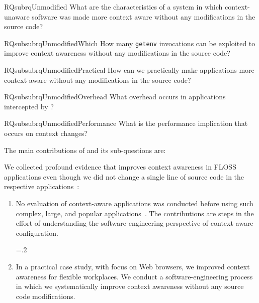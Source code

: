 \begin{restatable}{RQsub}{rqUnmodified}
What are the characteristics of a system in which context-unaware software was made more context aware without any modifications in the source code?%
\label{rq:unmodified}
\end{restatable}

\begin{restatable}{RQsubsub}{rqUnmodifiedWhich}
 \label{rq:unmodified-which}
How many \texttt{getenv} invocations can be exploited to improve context awareness without any modifications in the source code?
\end{restatable}

\begin{restatable}{RQsubsub}{rqUnmodifiedPractical}
\label{rq:unmodified-practical}
How can we practically make applications more context aware without any modifications in the source code?
\end{restatable}

\begin{restatable}{RQsubsub}{rqUnmodifiedOverhead}
\label{rq:unmodified-overhead}
What overhead occurs in applications intercepted by \elektra{}?
\end{restatable}

\begin{restatable}{RQsubsub}{rqUnmodifiedPerformance}
 \label{rq:unmodified-performance}
What is the performance implication that occurs on context changes?
\end{restatable}

The main contributions of  and its sub-questions are:
\begin{contribution}
We collected profound evidence that \elektra{} improves context awareness in FLOSS applications even though we did not change a single line of source code in the respective applications~\cite{raab2017introducing}:
\begin{enumerate}
\item
No evaluation of context-aware applications was conducted before using such complex, large, and popular applications~\cite{raab2017introducing}.
The contributions are steps in the effort of understanding the software-engineering perspective of context-aware configuration.%
{\parfillskip=0pt \emergencystretch=.2\textwidth \par}

\item 
In a practical case study, with focus on Web browsers, we improved context awareness for flexible workplaces.
We conduct a software-engineering process in which we systematically improve context awareness without any source code modifications.

\end{enumerate}
\end{contribution}

